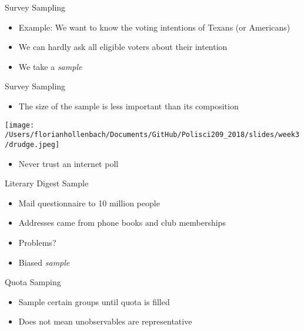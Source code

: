 \documentclass[presentation]{beamer}
\begin{document}
\begin{frame}[label={sec:org740f7f3}]{Survey Sampling}
\begin{itemize}
\item Example: We want to know the voting intentions of Texans (or Americans)
\item We can hardly ask all eligible voters about their intention
\end{itemize}

\pause
\begin{itemize}
\item We take a \emph{sample}
\end{itemize}
\end{frame}

\begin{frame}[label={sec:orgaf7c7f9}]{Survey Sampling}
\begin{itemize}
\item The size of the sample is less important than its composition
\end{itemize}

\begin{center}
\texttt{[image: /Users/florianhollenbach/Documents/GitHub/Polisci209\_2018/slides/week3/drudge.jpeg]}
\end{center}

\begin{itemize}
\item Never trust an internet poll
\end{itemize}
\end{frame}

\begin{frame}[label={sec:org14fee2e}]{Literary Digest Sample}
\begin{itemize}
\item Mail questionnaire to 10 million people

\item Addresses came from phone books and club memberships

\item Problems?
\end{itemize}

\pause

\begin{itemize}
\item Biased \emph{sample}
\end{itemize}
\end{frame}


\begin{frame}[label={sec:orgd65db0a}]{Quota Samping}
\begin{itemize}
\item Sample certain groups until quota is filled

\item Does not mean unobservables are representative
\end{itemize}
\end{frame}
\end{document}

